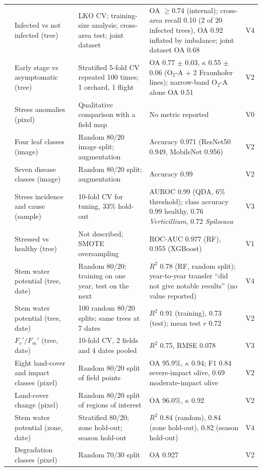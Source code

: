 \documentclass[preprint,12pt]{elsarticle}
\begin{document}
\begin{landscape}
\begin{longtable}{@{}L{2.46cm}L{3.06cm}L{5.27cm}L{6.45cm}c@{}}
\citet{u113} & Infected vs not infected (tree) & LKO CV; training-size analysis; cross-area test; joint dataset & OA $\geq$0.74 (internal); cross-area recall 0.10 (2 of 20 infected trees), OA 0.92 inflated by imbalance; joint dataset OA 0.68 & V4\\
\citet{u121} & Early stage vs asymptomatic (tree) & Stratified 5-fold CV repeated 100 times; 1 orchard, 1 flight & OA 0.77 $\pm$ 0.03, $\kappa$ 0.55 $\pm$ 0.06 (O$_2$-A + 2 Fraunhofer lines); narrow-band O$_2$-A alone OA 0.51 & V2\\
\citet{kallel2022olive} & Stress anomalies (pixel) & Qualitative comparison with a field map & No metric reported & V0\\
\citet{u046} & Four leaf classes (image) & Random 80/20 image split; augmentation & Accuracy 0.971 (ResNet50 0.949, MobileNet 0.956) & V2\\
\citet{u080} & Seven disease classes (image) & Random 80/20 split; augmentation & Accuracy 0.99 & V2\\
\citet{u045} & Stress incidence and cause (sample) & 10-fold CV for tuning, 33\% hold-out & AUROC 0.99 (QDA, 6\% threshold); class accuracy 0.99 healthy, 0.76 \textit{Verticillium}, 0.72 \textit{Spilocaea} & V3\\
\citet{u054} & Stressed vs healthy (tree) & Not described; SMOTE oversampling & ROC-AUC 0.977 (RF), 0.955 (XGBoost) & V1\\
\citet{u081} & Stem water potential (tree, date) & Random 80/20; training on one year, test on the next & $R^2$ 0.78 (RF, random split); year-to-year transfer ``did not give notable results'' (no value reported) & V4\\
\citet{u108} & Stem water potential (tree, date) & 100 random 80/20 splits; same trees at 7 dates & $R^2$ 0.91 (training), 0.73 (test); mean test $r$ 0.72 & V2\\
\citet{u106} & $F_v'/F_m'$ (tree, date) & 10-fold CV, 2 fields and 4 dates pooled & $R^2$ 0.75, RMSE 0.078 & V3\\
\citet{u105} & Eight land-cover and impact classes (pixel) & Random 80/20 split of field points & OA 95.9\%, $\kappa$ 0.94; F1 0.84 severe-impact olive, 0.69 moderate-impact olive & V2\\
\citet{u138} & Land-cover change (pixel) & Random 80/20 split of regions of interest & OA 96.0\%, $\kappa$ 0.92 & V2\\
\citet{u133} & Stem water potential (zone, date) & Stratified 80/20; zone hold-out; season hold-out & $R^2$ 0.84 (random), 0.84 (zone hold-out), 0.82 (season hold-out) & V4\\
\citet{u135} & Degradation classes (pixel) & Random 70/30 split & OA 0.927 & V2\\
\end{longtable}
\end{landscape}
 
\end{document}
